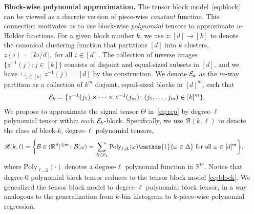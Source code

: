 \documentclass{article}
\newtheorem{lem}{Lemma}
\theoremstyle{definition}
\def\caliB{\mathscr{B}}
\begin{document}
{\bf Block-wise polynomial approximation.} The tensor block model~\eqref{eq:block} can be viewed as a discrete version of piece-wise \emph{constant} function. This connection motivates us to use block-wise \emph{polynomial} tensors to approximate $\alpha$-H\"older functions.  For a given block number $k$, we use $z\colon[d]\rightarrow [k]$ to denote the canonical clustering function that partitions $[d]$ into $k$ clusters,  $z(i) = \lceil ki/d\rceil,  \text{ for all } i\in[d].$
The collection of inverse images $\{z^{-1}(j)\colon j\in[k]\}$ consists of  disjoint and equal-sized subsets in $[d]$, and we have $\cup_{j\in[k]}z^{-1}(j) = [d]$ by the construction. We denote $\mathcal{E}_k$ as the $m$-way partition as a collection of $k^m$ disjoint, equal-sized blocks in $[d]^m$, such that 
\begin{align}\label{eq:blockind}
    \mathcal{E}_k = \{z^{-1}(j_1)\times\cdots\times z^{-1}(j_m)\colon (j_1,\ldots,j_m)\in [k]^m\}.
\end{align}
We propose to approximate the signal tensor $\Theta$ in~\eqref{eq:rep} by degree-$\ell$ polynomial tensor within each $\mathcal{E}_k$-block. Specifically, we use $\caliB(k,\ell)$ to denote the class of block-$k$, degree-$\ell$ polynomial tensors,
\begin{align}
    \caliB(k,\ell) = \bigg\{&\tB\in(\mathbb{R}^d)^{\otimes m}\colon \tB(\omega) = \sum_{\Delta\in\tE_k}\text{Poly}_{\ell,\Delta}(\omega)\mathds{1}\{\omega\in\Delta\}\text{ for all } \omega\in[d]^m\bigg\},
\end{align}
where $\text{Poly}_{\ell,\Delta}(\cdot)$ denotes a degree-$\ell$ polynomial function in $\mathbb{R}^m$. Notice that degree-0 polynomial block tensor reduces to the tensor block model \eqref{eq:block}. We genealized the tensor block model to degree-$\ell$ polynomial block tensor, in a way analogous to the generalization from $k$-bin histogram to $k$-piece-wise polynomial regression.

\end{document}
